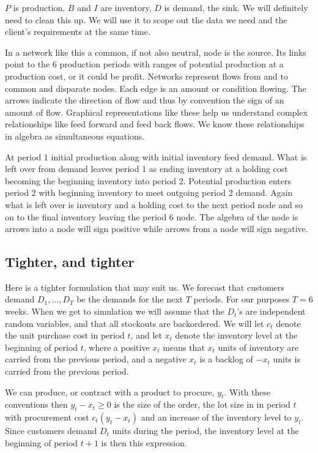 \documentclass[
]{book}
\begin{document}
\(P\) is production, \(B\) and \(I\) are inventory, \(D\) is demand, the sink. We will definitely need to clean this up. We will use it to scope out the data we need and the client's requirements at the same time.

In a network like this a common, if not also neutral, node is the source. Its links point to the 6 production periods with ranges of potential production at a production cost, or it could be profit. Networks represent flows from and to common and disparate nodes. Each edge is an amount or condition flowing. The arrows indicate the direction of flow and thus by convention the sign of an amount of flow. Graphical representations like these help us understand complex relationships like feed forward and feed back flows. We know these relationships in algebra as simultaneous equations.

At period 1 initial production along with initial inventory feed demand. What is left over from demand leaves period 1 as ending inventory at a holding cost becoming the beginning inventory into period 2. Potential production enters period 2 with beginning inventory to meet outgoing period 2 demand. Again what is left over is inventory and a holding cost to the next period node and so on to the final inventory leaving the period 6 node. The algebra of the node is arrows into a node will sign positive while arrows from a node will sign negative.

\hypertarget{tighter-and-tighter}{%
\subsection{Tighter, and tighter}\label{tighter-and-tighter}}

Here is a tighter formulation that may suit us. We forecast that customers demand \(D_1,\ldots, D_T\) be the demands for the next \(T\) periods. For our purposes \(T=6\) weeks. When we get to simulation we will assume that the \(D_t\)'s are independent random variables, and that all stockouts are backordered. We will let \(c_t\) denote the unit purchase cost in period \(t\), and let \(x_t\) denote the inventory level at the beginning of period \(t\), where a positive \(x_t\) means that \(x_t\) units of inventory are carried from the previous period, and a negative \(x_t\) is a backlog of \(−x_t\) units is carried from the previous period.

We can produce, or contract with a product to procure, \(y_t\). With these conventions then \(y_t −x_t ≥ 0\) is the size of the order, the lot size in in period \(t\) with procurement cost \(c_t(y_t − x_t)\) and an increase of the inventory level to \(y_t\). Since customers demand \(D_t\) units during the period, the inventory level at the beginning of period \(t + 1\) is then this expression.
\end{document}

